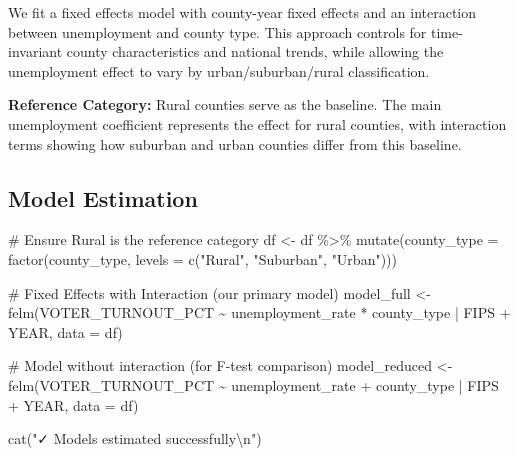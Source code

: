 \documentclass[
  11pt,
]{article}
\newenvironment{Shaded}{\begin{snugshade}}{\end{snugshade}}
\newcommand{\AttributeTok}[1]{\textcolor[rgb]{0.40,0.45,0.13}{#1}}
\newcommand{\CommentTok}[1]{\textcolor[rgb]{0.37,0.37,0.37}{#1}}
\newcommand{\FunctionTok}[1]{\textcolor[rgb]{0.28,0.35,0.67}{#1}}
\newcommand{\NormalTok}[1]{\textcolor[rgb]{0.00,0.23,0.31}{#1}}
\newcommand{\OtherTok}[1]{\textcolor[rgb]{0.00,0.23,0.31}{#1}}
\newcommand{\SpecialCharTok}[1]{\textcolor[rgb]{0.37,0.37,0.37}{#1}}
\newcommand{\StringTok}[1]{\textcolor[rgb]{0.13,0.47,0.30}{#1}}
\begin{document}
We fit a fixed effects model with county-year fixed effects and an
interaction between unemployment and county type. This approach controls
for time-invariant county characteristics and national trends, while
allowing the unemployment effect to vary by urban/suburban/rural
classification.

\textbf{Reference Category:} Rural counties serve as the baseline. The
main unemployment coefficient represents the effect for rural counties,
with interaction terms showing how suburban and urban counties differ
from this baseline.

\subsection{Model Estimation}\label{model-estimation}

\begin{Shaded}
\begin{Highlighting}[]
\CommentTok{\# Ensure Rural is the reference category}
\NormalTok{df }\OtherTok{\textless{}{-}}\NormalTok{ df }\SpecialCharTok{\%\textgreater{}\%}
  \FunctionTok{mutate}\NormalTok{(}\AttributeTok{county\_type =} \FunctionTok{factor}\NormalTok{(county\_type, }\AttributeTok{levels =} \FunctionTok{c}\NormalTok{(}\StringTok{"Rural"}\NormalTok{, }\StringTok{"Suburban"}\NormalTok{, }\StringTok{"Urban"}\NormalTok{)))}

\CommentTok{\# Fixed Effects with Interaction (our primary model)}
\NormalTok{model\_full }\OtherTok{\textless{}{-}} \FunctionTok{felm}\NormalTok{(VOTER\_TURNOUT\_PCT }\SpecialCharTok{\textasciitilde{}}\NormalTok{ unemployment\_rate }\SpecialCharTok{*}\NormalTok{ county\_type }\SpecialCharTok{|}\NormalTok{ FIPS }\SpecialCharTok{+}\NormalTok{ YEAR, }
               \AttributeTok{data =}\NormalTok{ df)}

\CommentTok{\# Model without interaction (for F{-}test comparison)}
\NormalTok{model\_reduced }\OtherTok{\textless{}{-}} \FunctionTok{felm}\NormalTok{(VOTER\_TURNOUT\_PCT }\SpecialCharTok{\textasciitilde{}}\NormalTok{ unemployment\_rate }\SpecialCharTok{+}\NormalTok{ county\_type }\SpecialCharTok{|}\NormalTok{ FIPS }\SpecialCharTok{+}\NormalTok{ YEAR, }
                      \AttributeTok{data =}\NormalTok{ df)}

\FunctionTok{cat}\NormalTok{(}\StringTok{"✓ Models estimated successfully}\SpecialCharTok{\textbackslash{}n}\StringTok{"}\NormalTok{)}
\end{Highlighting}
\end{Shaded}
\end{document}
